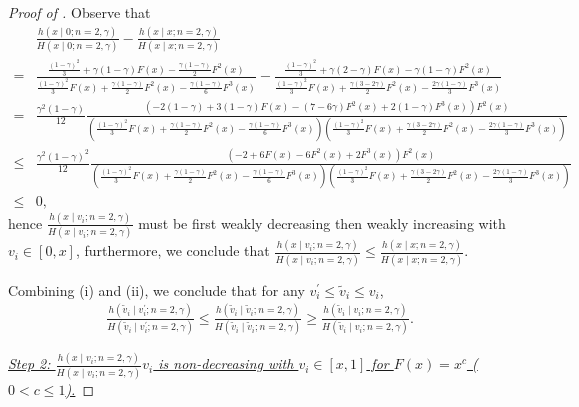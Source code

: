 \begin{proof}[{Proof of }]
Observe that 
\begin{align*}
&\frac{h(x\mid 0;n=2,\gamma)}{H(x\mid 0;n=2,\gamma)} - \frac{h(x\mid x;n=2,\gamma)}{H(x\mid x;n=2,\gamma)}\\
=& \frac{\frac{(1-\gamma)^2}{3} + \gamma(1-\gamma) F\left(x\right) - \frac{\gamma(1-\gamma)}{2} F^2\left(x\right) }{\frac{(1-\gamma)^2}{3}F\left(x\right) + \frac{\gamma(1-\gamma)}{2} F^2\left(x\right) - \frac{\gamma(1-\gamma)}{6} F^3\left(x\right) } - \frac{\frac{(1-\gamma)^2}{3} + \gamma(2-\gamma) F\left(x\right) - \gamma(1-\gamma)F^2\left(x\right) }{\frac{(1-\gamma)^2}{3}F\left(x\right) + \frac{\gamma(3-2\gamma)}{2} F^2\left(x\right) - \frac{2\gamma(1-\gamma)}{3} F^3\left(x\right) }\\
=&\frac{\gamma^2(1-\gamma)}{12}\frac{\left(-2(1-\gamma)+3(1-\gamma)F(x)-(7-6\gamma)F^2(x) +2(1-\gamma)F^3(x)\right)F^2(x)}{\left(\frac{(1-\gamma)^2}{3}F\left(x\right) + \frac{\gamma(1-\gamma)}{2} F^2\left(x\right) - \frac{\gamma(1-\gamma)}{6} F^3\left(x\right)\right)\left(\frac{(1-\gamma)^2}{3}F\left(x\right) + \frac{\gamma(3-2\gamma)}{2} F^2\left(x\right) - \frac{2\gamma(1-\gamma)}{3} F^3\left(x\right)\right)}\\
\leq &\frac{\gamma^2(1-\gamma)^2}{12}\frac{\left(-2+6F(x)-6F^2(x) +2F^3(x)\right)F^2(x)}{\left(\frac{(1-\gamma)^2}{3}F\left(x\right) + \frac{\gamma(1-\gamma)}{2} F^2\left(x\right) - \frac{\gamma(1-\gamma)}{6} F^3\left(x\right)\right)\left(\frac{(1-\gamma)^2}{3}F\left(x\right) + \frac{\gamma(3-2\gamma)}{2} F^2\left(x\right) - \frac{2\gamma(1-\gamma)}{3} F^3\left(x\right)\right)}\\
\leq & 0,
\end{align*}
hence $\frac{h(x\mid v_i;n=2,\gamma)}{H(x\mid v_i;n=2,\gamma)}$ must be first weakly decreasing then weakly increasing with $v_i \in[0,x]$, furthermore, we conclude that $\frac{h(x\mid v_i;n=2,\gamma)}{H(x\mid v_i;n=2,\gamma)} \leq \frac{h(x\mid x;n=2,\gamma)}{H(x\mid x;n=2,\gamma)}$.

\medskip

\noindent Combining (i) and (ii), we conclude that for any $v_i^\prime\leq \tilde{v}_i\leq v_i$, 
\begin{align*}  \frac{h(\tilde{v}_i\mid v_i^\prime;n=2,\gamma)}{H(\tilde{v}_i\mid v_i^\prime;n=2,\gamma)} 
\leq \frac{h(\tilde{v}_i\mid \tilde{v}_i;n=2,\gamma)}{H(\tilde{v}_i\mid \tilde{v}_i;n=2,\gamma)} 
\geq 
 \frac{h(\tilde{v}_i\mid v_i;n=2,\gamma)}{H(\tilde{v}_i\mid v_i;n=2,\gamma)}.
\end{align*}

\noindent\textit{\underline{Step 2: $\frac{h(x\mid v_i;n=2,\gamma)}{H(x\mid v_i;n=2,\gamma)}v_i$ is non-decreasing with $v_i \in [x,1]$ for $F(x) = x^c$ ($0< c\leq 1$).}}


\end{proof}

